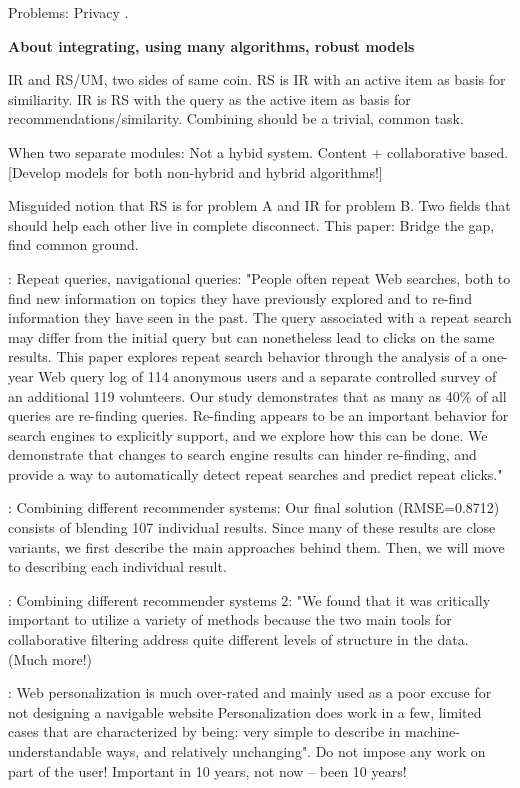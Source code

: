 Problems: Privacy \cite[p3]{Micarelli2007}.

\textbf{About integrating, using many algorithms, robust models}

IR and RS/UM, two sides of same coin.
RS is IR with an active item as basis for similiarity.
IR is RS with the query as the active item as basis for recommendations/similarity.
Combining should be a trivial, common task.

When two separate modules: Not a hybid system. Content + collaborative based.
[Develop models for both non-hybrid and hybrid algorithms!]

Misguided notion that RS is for problem A and IR for problem B.
Two fields that should help each other live in complete disconnect.
This paper: Bridge the gap, find common ground.


\cite{Teevan2007}: Repeat queries, navigational queries:
"People often repeat Web searches, both to find new information on topics they have previously explored and to re-find information they have seen in the past.
 The query associated with a repeat search may differ from the initial query but can nonetheless lead to clicks on the same results. 
This paper explores repeat search behavior through the analysis of a one-year Web query log of 114 anonymous users and a separate controlled survey of an 
additional 119 volunteers. Our study demonstrates that as many as 40\% of all queries are re-finding queries.
Re-finding appears to be an important behavior for search engines to explicitly support, and we explore how this can be done. 
We demonstrate that changes to search engine results can hinder re-finding, and provide a way to automatically detect repeat searches and predict repeat clicks."

\cite[p12]{Bell2007}: Combining different recommender systems:
Our final solution (RMSE=0.8712) consists of blending 107 individual results. Since many of these results are close variants, 
we first describe the main approaches behind them. Then, we will move to describing each individual result.

\cite[p75]{Bell2007d}: Combining different recommender systems 2:
"We found that it was critically important to utilize a variety of methods because the two main
tools for collaborative filtering address quite different levels of structure in the data. (Much more!)

\cite{Nielsen1998}: 
Web personalization is much over-rated and mainly used as a poor excuse for not designing a navigable website
Personalization does work in a few, limited cases that are characterized by being: very simple to describe in machine-understandable ways, and
relatively unchanging". Do not impose any work on part of the user!
Important in 10 years, not now -- been 10 years!


